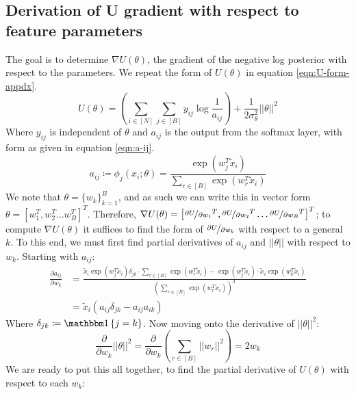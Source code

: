 \subsection{Derivation of U gradient with respect to feature parameters}
\label{appdx:gradu}
The goal is to determine $\nabla U(\theta)$, the gradient of the negative log posterior with respect to the parameters. We repeat the form of $U(\theta)$ in equation \ref{eqn:U-form-appdx}.
%
\begin{equation}
	U(\theta) = \left( \sum_{i \in [N]} \sum_{j \in [B]} y_{ij} \log \frac{1}{a_{ij}} \right)
	+ \frac{1}{2\sigma_\theta^2} ||\theta||^2
	\label{eqn:U-form-appdx}
\end{equation}
%
Where $y_{ij}$ is independent of $\theta$ and $a_{ij}$ is the output from the softmax layer, with form as given in equation \ref{eqn:a-ij}.
%
\begin{equation}
	a_{ij} \coloneqq \phi_{j} (x_i; \theta) = \frac{\exp(w_j^T \tilde{x}_i)}{\sum_{r \in [B]} \exp(w_r^T \tilde{x}_i)}
	\label{eqn:a-ij} 
\end{equation}
%
We note that $\theta = \{w_k\}_{k=1}^B$, and as such we can write this in vector form $\theta = \left[w_1^T, w_2^T \dots w_B^T  \right]^T$. Therefore, $\nabla U(\theta) = \left[\nicefrac{\partial U}{\partial w_1}^T,\nicefrac{\partial U}{\partial w_2}^T \dots \nicefrac{\partial U}{\partial w_B}^T  \right]^T$; to compute $\nabla U(\theta)$ it suffices to find the form of $\nicefrac{\partial U}{\partial w_k}$ with respect to a general $k$. To this end, we must first find partial derivatives of $a_{ij}$ and $||\theta||$ with respect to $w_k$. Starting with $a_{ij}$:
%
\begin{align}
	\frac{\partial a_{ij}}{\partial w_k} &= \frac
	{\tilde{x}_i \exp(w_j^T \tilde{x}_i) \delta_{jk} \cdot \sum_{r \in [B]} \exp(w_r^T \tilde{x}_i) 
		- 
		\exp(w_j^T \tilde{x}_i) \cdot \tilde{x}_i \exp(w_k^T \tilde{x}_i)}
	{\left( \sum_{r \in [B]} \exp(w_r^T \tilde{x}_i) \right)^2} \nonumber \\
	&= \tilde{x}_i \left( a_{ij} \delta_{jk} - a_{ij}a_{ik} \right) 
\end{align}
%
Where $\delta_{jk} \coloneqq \one \left\{ j = k \right\}$. Now moving onto the derivative of $||\theta||^2$:
%
\begin{equation}
	\frac{ \partial}{\partial w_k} ||\theta||^2 = \frac{\partial}{\partial w_k} \left( \sum_{r \in [B]} ||w_r||^2 \right) = 2w_k
\end{equation}
%
We are ready to put this all together, to find the partial derivative of $U(\theta)$ with respect to each $w_k$:
